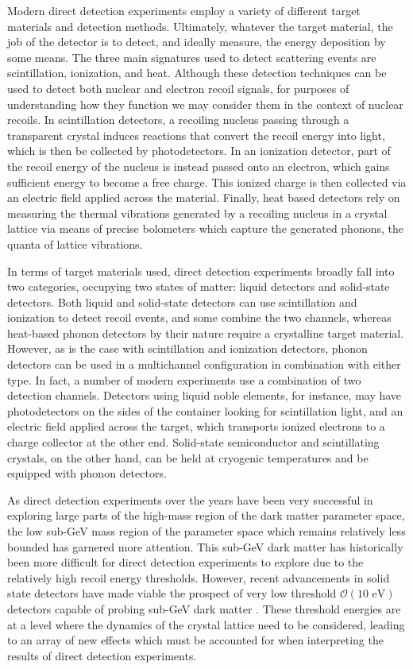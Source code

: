 \documentclass[b5paper, 10pt, twoside]{book}
\begin{document}
Modern direct detection experiments employ a variety of different target materials and detection methods. Ultimately, whatever the target material, the job of the detector is to detect, and ideally measure, the energy deposition by some means. The three main signatures used to detect scattering events are scintillation, ionization, and heat. Although these detection techniques can be used to detect both nuclear and electron recoil signals, for purposes of understanding how they function we may consider them in the context of nuclear recoils. In scintillation detectors, a recoiling nucleus passing through a transparent crystal induces reactions that convert the recoil energy into light, which is then be collected by photodetectors. In an ionization detector, part of the recoil energy of the nucleus is instead passed onto an electron, which gains sufficient energy to become a free charge. This ionized charge is then collected via an electric field applied across the material. Finally, heat based detectors rely on measuring the thermal vibrations generated by a recoiling nucleus in a crystal lattice via means of precise bolometers which capture the generated phonons, the quanta of lattice vibrations.

In terms of target materials used, direct detection experiments broadly fall into two categories, occupying two states of matter: liquid detectors and solid-state detectors. Both liquid and solid-state detectors can use scintillation and ionization to detect recoil events, and some combine the two channels, whereas heat-based phonon detectors by their nature require a crystalline target material. However, as is the case with scintillation and ionization detectors, phonon detectors can be used in a multichannel configuration in combination with either type. In fact, a number of modern experiments use a combination of two detection channels. Detectors using liquid noble elements, for instance, may have photodetectors on the sides of the container looking for scintillation light, and an electric field applied across the target, which transports ionized electrons to a charge collector at the other end. Solid-state semiconductor and scintillating crystals, on the other hand, can be held at cryogenic temperatures and be equipped with phonon detectors.

As direct detection experiments over the years have been very successful in exploring large parts of the high-mass region of the dark matter parameter space, the low sub-GeV mass region of the parameter space which remains relatively less bounded has garnered more attention. This sub-GeV dark matter has historically been more difficult for direct detection experiments to explore due to the relatively high recoil energy thresholds. However, recent advancements in solid state detectors have made viable the prospect of very low threshold $\mathcal{O}(\text{10 eV})$ detectors capable of probing sub-GeV dark matter \parencites{RomaniEtAl2018, CrislerEtAl2018, EDELWEISS2020}. These threshold energies are at a level where the dynamics of the crystal lattice need to be considered, leading to an array of new effects which must be accounted for when interpreting the results of direct detection experiments.
\end{document}
